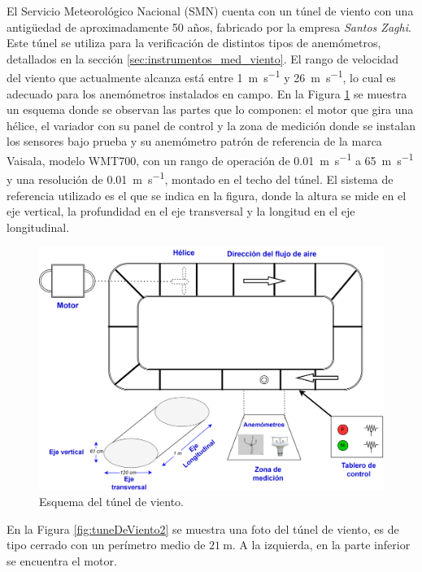 El Servicio Meteorológico Nacional (SMN) cuenta con un túnel de viento con una antigüedad de aproximadamente 50 años, fabricado por la empresa \textit{Santos Zaghi}. Este túnel se utiliza para la verificación de distintos tipos de anemómetros, detallados en la sección \ref{sec:instrumentos_med_viento}. El rango de velocidad del viento que actualmente alcanza está entre \SI{1}{\meter\per\second} y \SI{26}{\meter\per\second}, lo cual es adecuado para los anemómetros instalados en campo. En la Figura \ref{fig:tunelVientoEsquema} se muestra un esquema donde se observan las partes que lo componen: el motor que gira una hélice, el variador con su panel de control y la zona de medición donde se instalan los sensores bajo prueba y su anemómetro patrón de referencia de la marca Vaisala, modelo WMT700, con un rango de operación de \SI{0.01}{\meter\per\second} a \SI{65}{\meter\per\second} y una resolución de \SI{0.01}{\meter\per\second}, montado en el techo del túnel. El sistema de referencia utilizado es el que se indica en la figura, donde la altura se mide en el eje vertical, la profundidad en el eje transversal y la longitud en el eje longitudinal.

\begin{figure}[H]
    \centering
    \includegraphics[width=0.9\linewidth]{Figuras/viento/tunelDeViento/TunelVientoEsquema.png}
    \caption{Esquema del túnel de viento.}
    \label{fig:tunelVientoEsquema}
\end{figure}

En la Figura \ref{fig:tuneDeViento2} se muestra una foto del túnel de viento, es de tipo cerrado con un perímetro medio de $\SI{21}{\meter}$. A la izquierda, en la parte inferior se encuentra el motor.

